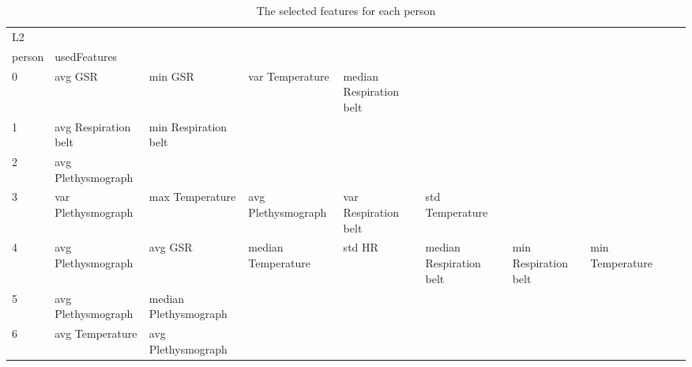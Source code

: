 \begin{landscape}
\begin{table}[]
\centering
\caption{The selected features for each person}
\begin{tabular}{l|llllllll}
L2       &                         &                       &                         &                         &                         &                       &                      &          &                      &        \\
person   & usedFeatures            &                       &                         &                         &                         &                       &                      &          &                      &        \\
0        & avg GSR                 & min GSR               & var Temperature         & median Respiration belt &                         &                       &                      &          &                      &        \\
1        & avg Respiration belt    & min Respiration belt  &                         &                         &                         &                       &                      &          &                      &        \\
2        & avg Plethysmograph      &                       &                         &                         &                         &                       &                      &          &                      &        \\
3        & var Plethysmograph      & max Temperature       & avg Plethysmograph      & var Respiration belt    & std Temperature         &                       &                      &          &                      &        \\
4        & avg Plethysmograph      & avg GSR               & median Temperature      & std HR                  & median Respiration belt & min Respiration belt  & min Temperature      &          &                      &        \\
5        & avg Plethysmograph      & median Plethysmograph &                         &                         &                         &                       &                      &          &                      &        \\
6        & avg Temperature         & avg Plethysmograph    &                         &                         &                         &                       &                      &          &                      &        \\

\end{tabular}
\end{table}
\end{landscape}
